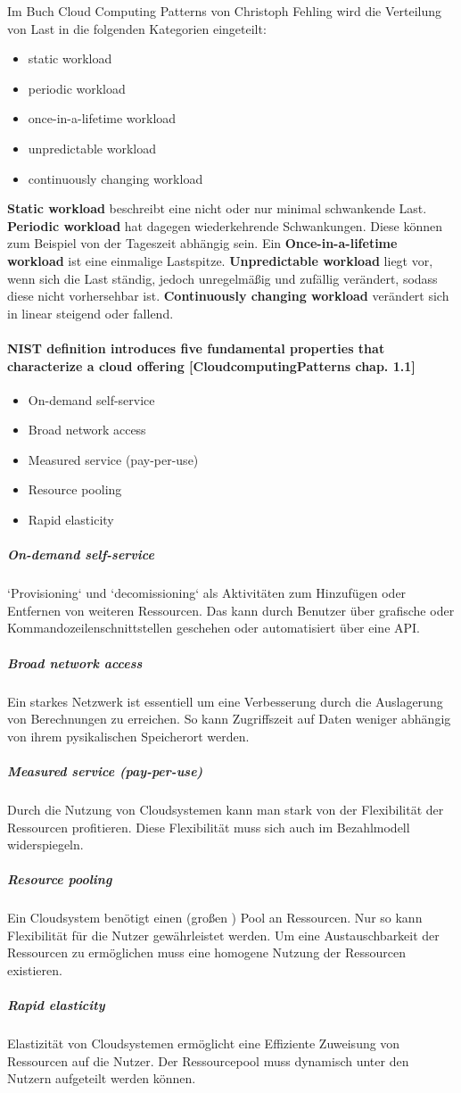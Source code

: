 \documentclass[a4paper,10pt]{article}
\begin{document}
Im Buch Cloud Computing Patterns von Christoph Fehling wird die Verteilung von Last in die folgenden Kategorien eingeteilt:

\begin{itemize}
 \item static workload
 \item periodic workload
 \item once-in-a-lifetime workload
 \item unpredictable workload
 \item continuously changing workload
\end{itemize}

\textbf{Static workload} beschreibt eine nicht oder nur minimal schwankende Last.
\textbf{Periodic workload} hat dagegen wiederkehrende Schwankungen. Diese können zum Beispiel von der Tageszeit abhängig sein.
Ein \textbf{Once-in-a-lifetime workload} ist eine einmalige Lastspitze.
\textbf{Unpredictable workload} liegt vor, wenn sich die Last ständig, jedoch unregelmäßig und zufällig verändert, sodass diese nicht vorhersehbar ist.
\textbf{Continuously changing workload} verändert sich in linear steigend oder fallend.

\paragraph{NIST definition introduces five fundamental properties that characterize a cloud offering [CloudcomputingPatterns chap. 1.1]}

\begin{itemize}
 \item On-demand self-service
 \item Broad network access
 \item Measured service (pay-per-use)
 \item Resource pooling
 \item Rapid elasticity
\end{itemize}

\subparagraph{On-demand self-service}
`Provisioning` und `decomissioning` als Aktivitäten zum Hinzufügen oder Entfernen von weiteren Ressourcen.
Das kann durch Benutzer über grafische oder Kommandozeilenschnittstellen geschehen oder automatisiert über eine API.
\subparagraph{Broad network access}
Ein starkes Netzwerk  ist essentiell um eine Verbesserung durch die Auslagerung von Berechnungen zu erreichen. 
So kann Zugriffszeit auf Daten weniger abhängig von ihrem pysikalischen Speicherort werden.
\subparagraph{Measured service (pay-per-use)}
Durch die Nutzung von Cloudsystemen kann man stark von der Flexibilität der Ressourcen profitieren.
Diese Flexibilität muss sich auch im Bezahlmodell widerspiegeln.
\subparagraph{Resource pooling}
Ein Cloudsystem benötigt einen (großen ) Pool an Ressourcen.
Nur so kann Flexibilität für die Nutzer gewährleistet werden.
Um eine Austauschbarkeit der Ressourcen zu ermöglichen muss eine homogene Nutzung der Ressourcen existieren. 
\subparagraph{Rapid elasticity}
Elastizität von Cloudsystemen ermöglicht eine Effiziente Zuweisung von Ressourcen auf die Nutzer.
Der Ressourcepool muss dynamisch unter den Nutzern aufgeteilt werden können.
\end{document}
